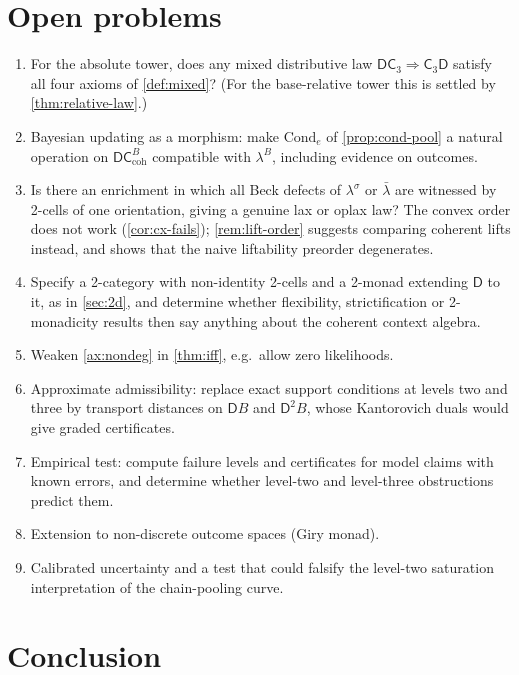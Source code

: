 \documentclass[11pt]{article}
\theoremstyle{definition}
\theoremstyle{remark}
\newcommand{\D}{\mathsf{D}}
\newcommand{\Cond}{\mathrm{Cond}}
\newcommand{\C}{\mathsf{C}}
\newcommand{\lb}{\bar\lambda}
\newcommand{\ls}{\lambda^{\sigma}}
\begin{document}
\section{Open problems}

\begin{enumerate}[leftmargin=*]
\item For the absolute tower, does any mixed distributive law $\D\C_3\Rightarrow\C_3\D$ satisfy
  all four axioms of \cref{def:mixed}? (For the base-relative tower this is settled by
  \cref{thm:relative-law}.)
\item Bayesian updating as a morphism: make $\Cond_e$ of \cref{prop:cond-pool} a natural operation
  on $\D\C^B_{\mathrm{coh}}$ compatible with $\lambda^B$, including evidence on outcomes.
\item Is there an enrichment in which all Beck defects of $\ls$ or $\lb$ are witnessed by 2-cells of
  one orientation, giving a genuine lax or oplax law? The convex order does not work
  (\cref{cor:cx-fails}); \cref{rem:lift-order} suggests comparing coherent lifts instead, and shows
  that the naive liftability preorder degenerates.
\item Specify a 2-category with non-identity 2-cells and a 2-monad extending $\D$ to it, as in
  \cref{sec:2d}, and determine whether flexibility, strictification or 2-monadicity results then say
  anything about the coherent context algebra.
\item Weaken \cref{ax:nondeg} in \cref{thm:iff}, e.g.\ allow zero likelihoods.
\item Approximate admissibility: replace exact support conditions at levels two and three by
  transport distances on $\D B$ and $\D^2B$, whose Kantorovich duals would give graded certificates.
\item Empirical test: compute failure levels and certificates for model claims with known errors, and
  determine whether level-two and level-three obstructions predict them.
\item Extension to non-discrete outcome spaces (Giry monad).
\item Calibrated uncertainty and a test that could falsify the level-two saturation interpretation of
  the chain-pooling curve.
\end{enumerate}

\section{Conclusion}
\end{document}
